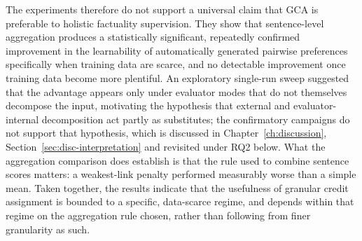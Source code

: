 The experiments therefore do not support a universal claim that GCA is preferable
to holistic factuality supervision. They show that sentence-level aggregation
produces a statistically significant, repeatedly confirmed improvement in the
learnability of automatically generated pairwise preferences specifically when
training data are scarce, and no detectable improvement once training data
become more plentiful. An exploratory single-run sweep suggested that the
advantage appears only under evaluator modes that do not themselves decompose
the input, motivating the hypothesis that external and evaluator-internal
decomposition act partly as substitutes; the confirmatory campaigns do not
support that hypothesis, which is discussed in
Chapter~\ref{ch:discussion}, Section~\ref{sec:disc-interpretation} and revisited
under RQ2 below. What the aggregation comparison does establish is that the rule
used to combine sentence scores matters: a weakest-link penalty performed
measurably worse than a simple mean. Taken together, the results indicate that
the usefulness of granular credit assignment is bounded to a specific,
data-scarce regime, and depends within that regime on the aggregation rule
chosen, rather than following from finer granularity as such.

